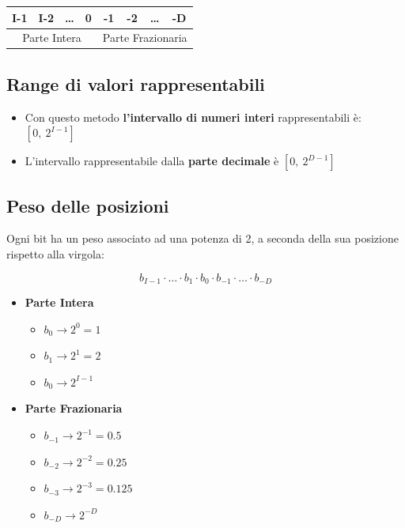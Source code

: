 \begin{center}
    \begin{tabular}{|*{8}{c|}}
      \hline
      I-1 & I-2 & \dots & 0 & -1 & -2 & \dots & -D \\
      \hline
      \multicolumn{4}{|c|}{Parte Intera} & \multicolumn{4}{c|}{Parte Frazionaria} \\
      \hline
    \end{tabular}
\end{center}

\subsection{Range di valori rappresentabili}
\begin{itemize}
    \item Con questo metodo \textbf{l'intervallo di numeri interi} rappresentabili è: $[0,\ 2^{I-1}]$
    \item L'intervallo rappresentabile dalla \textbf{parte decimale} è $[0,\ 2^{D-1}]$
\end{itemize}

\newpage
\subsection{Peso delle posizioni}
Ogni bit ha un peso associato ad una potenza di 2, a seconda della sua posizione rispetto alla virgola:

{
    \large
    $$
    b_{I-1} \cdot \dots \cdot b_1 \cdot b_0 \cdot b_{-1} \cdot \dots \cdot b_{-D}
    $$
}

\begin{itemize}
    \item \textbf{Parte Intera}
    \begin{itemize}
        \item $b_0 \to 2^0 = 1$
        \item $b_1 \to 2^1 = 2$
        \item $b_0 \to 2^{I-1}$
    \end{itemize}
    \item \textbf{Parte Frazionaria}
    \begin{itemize}
        \item $b_{-1} \to 2^{-1} = 0.5$
        \item $b_{-2} \to 2^{-2} = 0.25$
        \item $b_{-3} \to 2^{-3} = 0.125$
        \item $b_{-D} \to 2^{-D}$
    \end{itemize}
\end{itemize}

